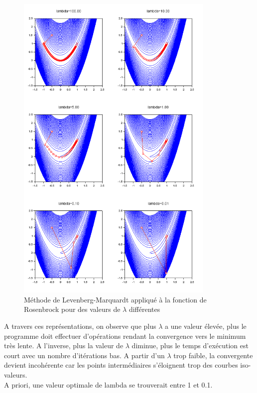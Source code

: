             \begin{figure}[H]
              \centering
              \captionsetup{font=small}
                \includegraphics[width=0.85\textwidth]{images/LM2.png}
              \caption{Méthode de Levenberg-Marquardt appliqué à la fonction de Rosenbrock pour des valeurs de $\lambda$ différentes}
              \label{fig:LM2}
            \end{figure}
            A travers ces représentations, on observe que plus $\lambda$ a une valeur élevée, plus le programme doit effectuer d'opérations rendant la convergence vers le minimum très lente. A l'inverse, plus la valeur de $\lambda$ diminue, plus le temps d'exécution est court avec un nombre d'itérations bas. A partir d'un $\lambda$ trop faible, la convergente devient incohérente car les points intermédiaires s'éloignent trop des courbes iso-valeurs. \\A priori, une valeur optimale de lambda se trouverait entre 1 et 0.1. 
